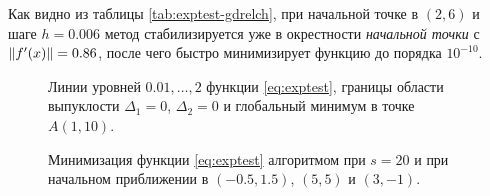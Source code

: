 Как видно из таблицы \ref{tab:exptest-gdrelch}, при начальной точке в
$(2,6)$ и шаге $h=0.006$ метод \gdrelch{} стабилизируется уже в
окрестности \emph{начальной точки} с $\left \lVert{f'(x)}\right \rVert = 0.86$, после чего
быстро минимизирует функцию до порядка $10^{-10}$.

\begin{figure}[thb]
  \centering
  \caption[Экспоненциальная функция]{Линии уровней $0.01,\dotsc,2$
    функции \eqref{eq:exptest}, границы области выпуклости
    $\Delta_1=0$, $\Delta_2=0$ и глобальный минимум в точке $A(1,
    10)$.}
  \label{fig:exptest-convexity}
\end{figure}

\begin{figure}[thb]
  \centering
  \caption[\relch{} на экспоненциальной функции]{Минимизация функции
    \eqref{eq:exptest} алгоритмом \relch{} при $s=20$ и при начальном
    приближении в $(-0.5,1.5)$, $(5,5)$ и $(3,-1)$.}
  \label{fig:exptest-relch}
\end{figure}

